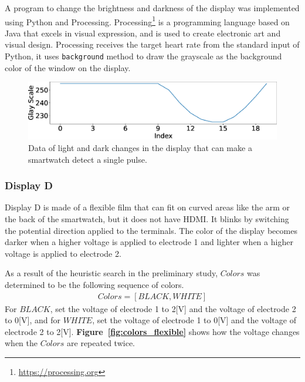 \documentclass[sigchi,authordraft]{acmart}
\newcommand\figref[1]{\textbf{Figure~\ref{fig:#1}}}
\begin{document}
A program to change the brightness and darkness of the display was implemented using Python and Processing. Processing\footnote{\url{https://processing.org}} is a programming language based on Java that excels in visual expression, and is used to create electronic art and visual design. Processing receives the target heart rate from the standard input of Python, it uses \texttt{background} method to draw the grayscale as the background color of the window on the display.

\begin{figure}[!t]
  \centering
  \includegraphics[width=1\linewidth]{figures/colors_wave.eps}
  \caption{Data of light and dark changes in the display that can make a smartwatch detect a single pulse.}
  \label{fig:colors_wave}
\end{figure}

\subsubsection{Display D}
Display D is made of a flexible film that can fit on curved areas like the arm or the back of the smartwatch, but it does not have HDMI. It blinks by switching the potential direction applied to the terminals. The color of the display becomes darker when a higher voltage is applied to electrode 1 and lighter when a higher voltage is applied to electrode 2.\par

As a result of the heuristic search in the preliminary study, $Colors$ was determined to be the following sequence of colors.
\begin{equation*}
  \begin{split}
    Colors = [BLACK, WHITE]
  \end{split}
\end{equation*}
For $BLACK$, set the voltage of electrode 1 to 2[V] and the voltage of electrode 2 to 0[V], and for $WHITE$, set the voltage of electrode 1 to 0[V] and the voltage of electrode 2 to 2[V]. \figref{colors_flexible} shows how the voltage changes when the $Colors$ are repeated twice.\par
\end{document}
